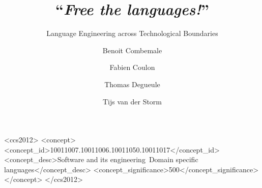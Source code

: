 \documentclass[sigplan]{acmart}
\begin{document}
\title{``\emph{Free the languages!}''}
\subtitle{Language Engineering across Technological Boundaries}

\author{Benoit Combemale}

\author{Fabien Coulon}

\author{Thomas Degueule}

\author{Tijs van der Storm}




%
%
 \begin{CCSXML}
	<ccs2012>
	<concept>
	<concept_id>10011007.10011006.10011050.10011017</concept_id>
	<concept_desc>Software and its engineering~Domain specific languages</concept_desc>
	<concept_significance>500</concept_significance>
	</concept>
	</ccs2012>
\end{CCSXML}




\maketitle
\end{document}
